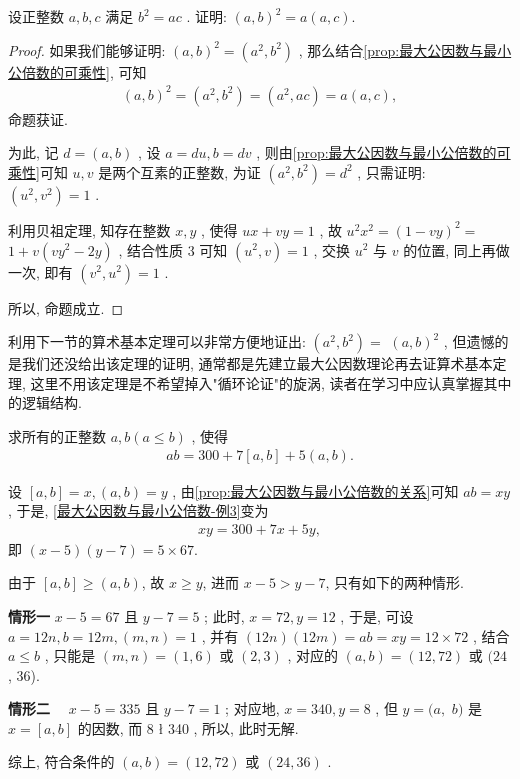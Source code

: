 \begin{example}
	设正整数 $a ,  b ,  c$ 满足 $b^{2}=a c$ . 证明: $(a, b)^{2}=a(a, c)$.
\end{example}
\begin{proof}
	如果我们能够证明:  $(a, b)^{2}=\left(a^{2}, b^{2}\right)$ , 那么结合\autoref{prop:最大公因数与最小公倍数的可乘性}, 可知
	\begin{align*}
		(a, b)^{2}=\left(a^{2}, b^{2}\right)=\left(a^{2}, a c\right)=a(a, c),
	\end{align*}
	命题获证.

	为此, 记 $d=(a, b)$ , 设 $a=d u, b=d v$ , 则由\autoref{prop:最大公因数与最小公倍数的可乘性}可知 $u ,  v$ 是两个互素的正整数, 为证 $\left(a^{2}, b^{2}\right)=d^{2}$ , 只需证明:  $\left(u^{2}, v^{2}\right)=1$ .

	利用贝祖定理, 知存在整数 $x ,  y$ , 使得 $u x+v y=1$ , 故 $u^{2} x^{2}=(1-v y)^{2}=$ $1+v\left(v y^{2}-2 y\right)$ , 结合性质 3 可知 $\left(u^{2}, v\right)=1$ , 交换 $u^{2}$ 与 $v$ 的位置, 同上再做一次, 即有 $\left(v^{2}, u^{2}\right)=1$ .

	所以, 命题成立.
\end{proof}
\begin{note}
	利用下一节的算术基本定理可以非常方便地证出:  $\left(a^{2}, b^{2}\right)=$ $(a, b)^{2}$ , 但遗憾的是我们还没给出该定理的证明, 通常都是先建立最大公因数理论再去证算术基本定理, 这里不用该定理是不希望掉入"循环论证"的旋涡, 读者在学习中应认真掌握其中的逻辑结构.
\end{note}

\begin{example}
	求所有的正整数 $a ,  b(a \leqslant b)$ , 使得
	\begin{align}\label{最大公因数与最小公倍数-例3}
		a b=300+7[a, b]+5(a, b).
	\end{align}
\end{example}
\begin{solution}
	设 $[a, b]=x,(a, b)=y$ , 由\autoref{prop:最大公因数与最小公倍数的关系}可知 $a b=x y$ , 于是, \autoref{最大公因数与最小公倍数-例3}变为
	\begin{align*}
		x y=300+7 x+5 y,
	\end{align*}
	即 $(x-5)(y-7)=5 \times 67$.

	由于 $[a, b] \geqslant(a, b)$, 故 $x \geqslant y$, 进而 $x-5>y-7$, 只有如下的两种情形.

	\textbf{情形一} $x-5=67$ 且 $y-7=5$ ; 此时,  $x=72, y=12$ , 于是, 可设 $a=12 n ,  b=12 m , (m, n)=1$ , 并有 $(12 n)(12 m)=a b=x y=12 \times 72$ , 结合 $a \leqslant b$ , 只能是 $(m, n)=(1,6)$ 或 $(2,3)$ , 对应的 $(a, b)=(12,72)$ 或 $(24$ ,  36).

	\textbf{情形二} $\quad x-5=335$ 且 $y-7=1$ ; 对应地,  $x=340, y=8$ , 但 $y=(a , $ $b )$ 是 $x=[a, b]$ 的因数, 而 8 ł 340 , 所以, 此时无解.

	综上, 符合条件的 $(a, b)=(12,72)$ 或 $(24,36)$ .
\end{solution}


